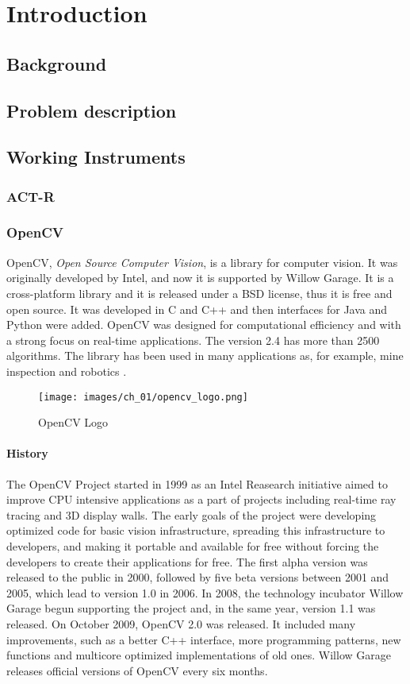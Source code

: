 \chapter{Introduction}
\section{Background}
\section{Problem description}
\section{Working Instruments}
\subsection{ACT-R}
\subsection{OpenCV}
	OpenCV, \emph{Open Source Computer Vision}, is a library for computer vision. It was originally developed by Intel, and now it is supported by Willow Garage.
	It is a cross-platform library and it is released under a BSD license, thus it is free and open source. It was developed in C and C++ and then interfaces for Java and Python were added. OpenCV was designed for computational efficiency and with a strong focus on real-time applications. The version 2.4 has more than 2500 algorithms. The library has been used in many applications as, for example, mine inspection and robotics \cite{OCVMain:2012:Misc}.
	\begin{wrapfigure}{l}{0.2\textwidth}
  		\begin{center}
  	  	\texttt{[image: images/ch\_01/opencv\_logo.png]}
  		\end{center}
  		\caption{OpenCV Logo}
	\end{wrapfigure}		
	
	\subsubsection*{History}
	The OpenCV Project started in 1999 as an Intel Reasearch initiative aimed to improve CPU intensive applications as a part of projects including real-time ray tracing and 3D display walls. The early goals of the project were developing optimized code for basic vision infrastructure, spreading this infrastructure to developers, and making it portable and available for free without forcing the developers to create their applications for free.
	The first alpha version was released to the public in 2000, followed by five beta versions between 2001 and 2005, which lead to version 1.0 in 2006. In 2008, the technology incubator Willow Garage begun supporting the project and, in the same year, version 1.1  was released. 
	On October 2009, OpenCV 2.0 was released. It included many improvements, such as a better C++ interface, more programming patterns, new functions and multicore optimized implementations of old ones. Willow Garage releases official versions of OpenCV every six months.
